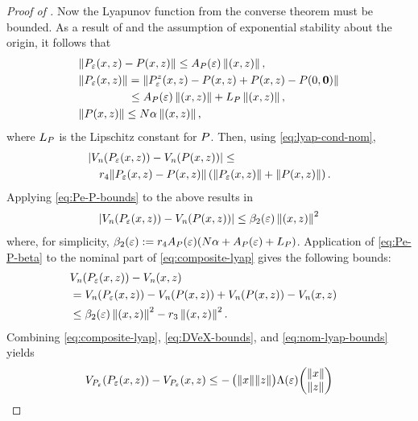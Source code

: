 \documentclass[twocolumn]{article}
\begin{document}
\begin{proof} [Proof of ]
  Now the Lyapunov function from the converse theorem must be bounded.
  As a result of  and the assumption of exponential stability about the origin, it follows that
  \begin{align}
    \label{eq:Pe-P-bounds}
    &\| \Pe\argsxz - \P\argsxz \| \leq \Ae \nzdxz,\\
    \nonumber
    &\| \Pe\argsxz \| = \| \Pez\argsxz - \P\argsxz + \P\argsxz - \P\argszero\|\\
    \nonumber
    & \hspace{4.4em} \leq \Ae \nzdxz  + \LP\nzdxz,\\
    \nonumber
    &\| \P\argsxz \| \leq N \alpha \nzdxz,
  \end{align}
  where $\LP$ is the Lipschitz constant for $\P$.
  Then, using \eqref{eq:lyap-cond-nom},
  \begin{align}
    \lefteqn{| \Vn(\Pe\argsxz) - \Vn(\P\argsxz) | \leq}\\
    \nonumber
    &&r_{4} \| \Pe\argsxz - \P\argsxz \| \left( \|\Pe\argsxz\| + \|\P\argsxz\| \right).
  \end{align}
  Applying \eqref{eq:Pe-P-bounds} to the above results in
  \begin{align}
    \label{eq:Pe-P-beta}
    | \Vn(\Pe\argsxz) - \Vn(\P\argsxz) | \leq \bepstwo \nzdxz^{2}
  \end{align}
  where, for simplicity, $\bepstwo := r_{4} \Ae (N \alpha + \Ae  + \LP)$.
  Application of \eqref{eq:Pe-P-beta} to the nominal part of \eqref{eq:composite-lyap} gives the following bounds:
  \begin{align}
    \label{eq:nom-lyap-bounds}
    \lefteqn{\Vn(\Pe\argsxz) - \Vn\argsxz }\\
    \nonumber
    &= \Vn(\Pe\argsxz) - \Vn(\P\argsxz) + \Vn(\P\argsxz) - \Vn\argsxz\\
    \nonumber
    &\leq \bepstwo \nzdxz^{2} - r_{3} \nzdxz^{2}.
  \end{align}
  Combining \eqref{eq:composite-lyap}, \eqref{eq:DVeX-bounds}, and \eqref{eq:nom-lyap-bounds} yields
  \begin{align}
    \VP(\Pe\argsxz) - \VP\argsxz \leq
    -\left(\!\!\!\begin{array}{c c}
    \nzdx\!\!\! & \!\!\!\nzdz
    \end{array}\!\!\!\right)
    \!\Le\!
    \left(\!\!\!\begin{array}{c}
    \nzdx\\
    \nzdz
    \end{array}\!\!\!\right)

\end{align}
\end{proof}
\end{document}
